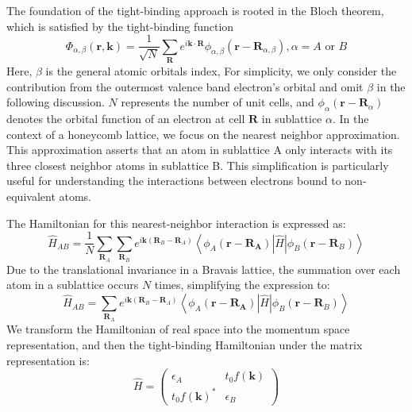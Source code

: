 The foundation of the tight-binding approach is rooted in the Bloch theorem, which is satisfied by the tight-binding function
\begin{equation}
	\Phi_{\alpha,\beta}(\mathbf{r}, \mathbf{k})=\frac{1}{\sqrt{N}} \sum_{\mathbf{R}} e^{i \mathbf{k}
			\cdot \mathbf{R}} \phi_{\alpha,\beta}\left(\mathbf{r}-\mathbf{R}_{\alpha,\beta}\right), \alpha=A \text { or } B
	\label{eqn:Bloch}
\end{equation}
Here, $\beta$ is the general atomic orbitals index,
For simplicity, we only consider the contribution from the outermost valence band electron's
orbital and omit $\beta$ in the following discussion. $N$ represents the number of unit cells, and $\phi_{\alpha}(\mathbf{r} - \mathbf{R}_{\alpha})$ denotes the orbital function of an electron at cell $\mathbf{R}$ in sublattice $\alpha$.
In the context of a honeycomb lattice, we focus on the nearest neighbor approximation. This approximation asserts that an atom in sublattice A only interacts with its three closest neighbor atoms in sublattice B. This simplification is particularly useful for understanding the interactions between electrons bound to non-equivalent atoms.

The Hamiltonian for this nearest-neighbor interaction is expressed as:
\begin{equation}
	\hat{H}_{A B}=\frac{1}{N} \sum_{\mathbf{R}_{A}} \sum_{\mathbf{R}_{B}} e^{i \mathbf{k}\left(\mathbf{R}_{B}-\mathbf{R}_{A}\right)}\left\langle\phi_{A}\left(\mathbf{r}-\mathbf{R}_{\mathbf{A}}\right)|\hat H| \phi_{B}\left(\mathbf{r}-\mathbf{R}_{B}\right)\right\rangle
\end{equation}
Due to the translational invariance in a Bravais lattice, the summation over each atom in a sublattice occurs $N$ times, simplifying the expression to:
\begin{equation}
	\hat{H}_{A B}=\sum_{\mathbf{R}_{A}} e^{i \mathbf{k}\left(\mathbf{R}_{B}-\mathbf{R}_{A}\right)}\left\langle\phi_{A}\left(\mathbf{r}-\mathbf{R}_{\mathbf{A}}\right)|\hat{H}| \phi_{B}\left(\mathbf{r}-\mathbf{R}_{B}\right)\right\rangle
\end{equation}
We transform the Hamiltonian of real space into the momentum space representation, and then the
tight-binding Hamiltonian under the matrix representation is:
\begin{equation}
	\hat{H} =\left(\begin{array}{cc}
			\epsilon_{A}            & t_{0} f(\mathbf{k}) \\
			t_{0} f(\mathbf{k})^{*} & \epsilon_{B}
		\end{array}\right)
	\label{eqn: TBh}
\end{equation}

